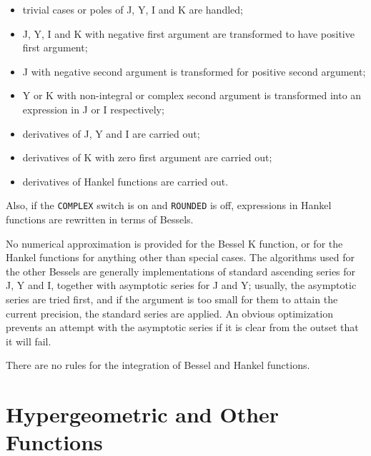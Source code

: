 \documentclass[11pt]{article}
\begin{document}
\begin{itemize}
\item trivial cases or poles of J, Y, I and K are handled;
\item J, Y, I and K with negative first argument are transformed to have
positive first argument;
\item J with negative second argument is transformed for positive second
argument;
\item Y or K with non-integral or complex second argument is transformed
into an expression in J or I respectively;
\item derivatives of J, Y and I are carried out;
\item derivatives of K with zero first argument are carried out;
\item derivatives of Hankel functions are carried out.
\end{itemize}
Also, if the {\tt COMPLEX} switch is on and {\tt ROUNDED} is off,
expressions in Hankel functions are rewritten in terms of Bessels.

No numerical approximation is provided for the Bessel K function, or for
the Hankel functions for anything other than special cases.  The
algorithms used for the other Bessels are generally implementations of
standard ascending series for J, Y and I, together with asymptotic
series for J and Y; usually, the asymptotic series are tried first, and
if the argument is too small for them to attain the current precision,
the standard series are applied.  An obvious optimization prevents an
attempt with the asymptotic series if it is clear from the outset that
it will fail.

There are no rules for the integration of Bessel and Hankel functions.


\section{Hypergeometric and Other Functions}
\end{document}
